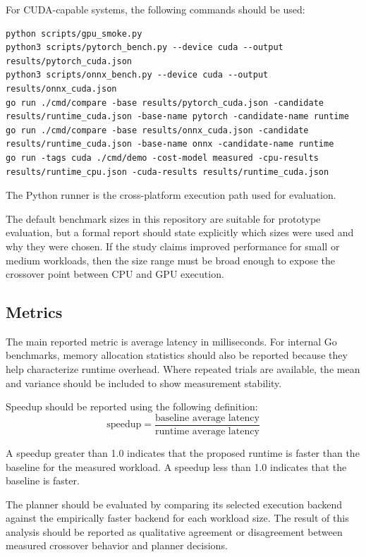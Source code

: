 \documentclass[12pt]{article}
\begin{document}
For CUDA-capable systems, the following commands should be used:

\begin{verbatim}
python scripts/gpu_smoke.py
python3 scripts/pytorch_bench.py --device cuda --output results/pytorch_cuda.json
python3 scripts/onnx_bench.py --device cuda --output results/onnx_cuda.json
go run ./cmd/compare -base results/pytorch_cuda.json -candidate results/runtime_cuda.json -base-name pytorch -candidate-name runtime
go run ./cmd/compare -base results/onnx_cuda.json -candidate results/runtime_cuda.json -base-name onnx -candidate-name runtime
go run -tags cuda ./cmd/demo -cost-model measured -cpu-results results/runtime_cpu.json -cuda-results results/runtime_cuda.json
\end{verbatim}

The Python runner is the cross-platform execution path used for evaluation.

The default benchmark sizes in this repository are suitable for prototype evaluation, but a formal report should state explicitly which sizes were used and why they were chosen. If the study claims improved performance for small or medium workloads, then the size range must be broad enough to expose the crossover point between CPU and GPU execution.

\subsection{Metrics}

The main reported metric is average latency in milliseconds. For internal Go benchmarks, memory allocation statistics should also be reported because they help characterize runtime overhead. Where repeated trials are available, the mean and variance should be included to show measurement stability.

Speedup should be reported using the following definition:
\[
\text{speedup} = \frac{\text{baseline average latency}}{\text{runtime average latency}}
\]

A speedup greater than 1.0 indicates that the proposed runtime is faster than the baseline for the measured workload. A speedup less than 1.0 indicates that the baseline is faster.

The planner should be evaluated by comparing its selected execution backend against the empirically faster backend for each workload size. The result of this analysis should be reported as qualitative agreement or disagreement between measured crossover behavior and planner decisions.
\end{document}
